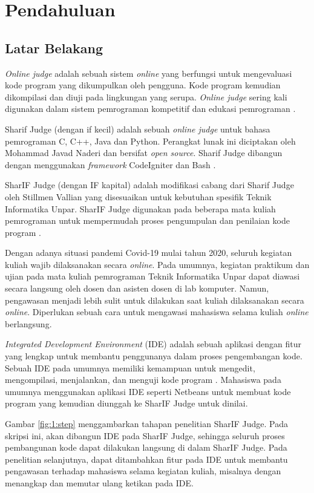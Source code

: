 \chapter{Pendahuluan}
\label{chap:intro}
   
\section{Latar Belakang}
\label{sec:label}

\textit{Online judge} adalah sebuah sistem \textit{online} yang berfungsi untuk mengevaluasi kode program yang dikumpulkan oleh pengguna. Kode program kemudian dikompilasi dan diuji pada lingkungan yang serupa. \textit{Online judge} sering kali digunakan dalam sistem pemrograman kompetitif dan edukasi pemrograman \cite{judge}.

Sharif Judge (dengan if kecil) adalah sebuah \textit{online judge} untuk bahasa pemrograman C, C++, Java dan Python. Perangkat lunak ini diciptakan oleh Mohammad Javad Naderi dan bersifat \textit{open
source}. Sharif Judge dibangun dengan menggunakan \textit{framework} CodeIgniter dan Bash \cite{sharif}.

SharIF Judge (dengan IF kapital) adalah modifikasi cabang dari Sharif Judge oleh Stillmen Vallian yang disesuaikan untuk kebutuhan spesifik Teknik Informatika Unpar. SharIF Judge digunakan pada beberapa mata kuliah pemrograman untuk mempermudah proses pengumpulan dan penilaian kode program \cite{stillmen:sharif}.

Dengan adanya situasi pandemi Covid-19 mulai tahun 2020, seluruh kegiatan kuliah wajib dilaksanakan secara \textit{online}. Pada umumnya, kegiatan praktikum dan ujian pada mata kuliah pemrograman Teknik Informatika Unpar dapat diawasi secara langsung oleh dosen dan asisten dosen di lab komputer.  Namun, pengawasan menjadi lebih sulit untuk dilakukan saat kuliah dilaksanakan secara \textit{online}. Diperlukan sebuah cara untuk mengawasi mahasiswa selama kuliah \textit{online} berlangsung. 

{\it Integrated Development Environment} (IDE) adalah sebuah aplikasi dengan fitur yang lengkap untuk membantu penggunanya dalam proses pengembangan kode. Sebuah IDE pada umumnya memiliki kemampuan untuk mengedit, mengompilasi, menjalankan, dan menguji kode program \cite{ide}.  Mahasiswa pada umumnya menggunakan aplikasi IDE seperti Netbeans untuk membuat kode program yang kemudian diunggah ke SharIF Judge untuk dinilai.

Gambar \ref{fig:1:step} menggambarkan tahapan penelitian SharIF Judge. Pada skripsi ini, akan dibangun IDE pada SharIF Judge, sehingga seluruh proses pembangunan kode dapat dilakukan langsung di dalam SharIF Judge. Pada penelitian selanjutnya, dapat ditambahkan fitur pada IDE untuk membantu pengawasan terhadap mahasiswa selama kegiatan kuliah, misalnya dengan menangkap dan memutar ulang ketikan pada IDE.


